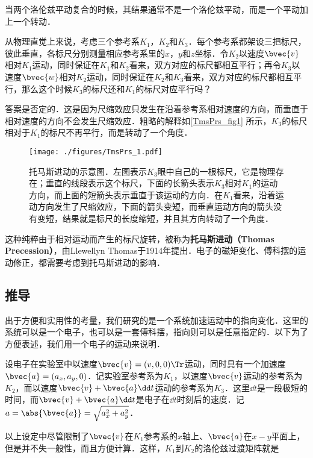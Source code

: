 

当两个洛伦兹平动复合的时候，其结果通常不是一个洛伦兹平动，而是一个平动加上一个转动．

从物理直觉上来说，考虑三个参考系$K_1$，$K_2$和$K_3$．每个参考系都架设三把标尺，彼此垂直，各标尺分别测量相应参考系里的$x$，$y$和$z$坐标．令$K_2$以速度$\bvec{v}$相对$K_1$运动，同时保证在$K_1$和$K_2$看来，双方对应的标尺都相互平行；再令$K_3$以速度$\bvec{w}$相对$K_2$运动，同时保证在$K_2$和$K_3$看来，双方对应的标尺都相互平行，那么这个时候$K_3$的标尺还和$K_1$的标尺对应平行吗？

答案是否定的．这是因为尺缩效应只发生在沿着参考系相对速度的方向，而垂直于相对速度的方向不会发生尺缩效应．粗略的解释如\autoref{TmsPrs_fig1} 所示，$K_3$的标尺相对于$K_1$的标尺不再平行，而是转动了一个角度．

\begin{figure}[ht]
\centering
\texttt{[image: ./figures/TmsPrs\_1.pdf]}
\caption{托马斯进动的示意图．左图表示$K_3$眼中自己的一根标尺，它是物理存在；垂直的线段表示这个标尺，下面的长箭头表示$K_3$相对$K_1$的运动方向，而上面的短箭头表示垂直于该运动的方向．在$K_1$看来，沿着运动方向发生了尺缩效应，下面的箭头变短，而垂直运动方向的箭头没有变短，结果就是标尺的长度缩短，并且其方向转动了一个角度．} \label{TmsPrs_fig1}
\end{figure}

这种纯粹由于相对运动而产生的标尺旋转，被称为\textbf{托马斯进动（Thomas Precession）}，由Llewellyn Thomas于1914年提出．电子的磁矩变化、傅科摆的运动修正，都需要考虑到托马斯进动的影响．

\subsection{推导}

出于方便和实用性的考量，我们研究的是一个系统加速运动中的指向变化．这里的系统可以是一个电子，也可以是一套傅科摆，指向则可以是任意指定的．以下为了方便表述，我们用一个电子的运动来说明．

设电子在实验室中以速度$\bvec{v}=(v, 0, 0)\Tr$运动，同时具有一个加速度$\bvec{a}=(a_x, a_y, 0)$．记实验室参考系为$K_1$，以速度$\bvec{v}$运动的参考系为$K_2$，而以速度$\bvec{v}+\bvec{a}\dd t$运动的参考系为$K_3$．这里$\dd t$是一段极短的时间，而$\bvec{v}+\bvec{a}\dd t$是电子在$\dd t$时刻后的速度．记$a=\abs{\bvec{a}}=\sqrt{a_x^2+a_y^2}$．

以上设定中尽管限制了$\bvec{v}$在$K_1$参考系的$x$轴上、$\bvec{a}$在$x-y$平面上，但是并不失一般性，而且方便计算．这样，$K_1$到$K_2$的洛伦兹过渡矩阵就是

